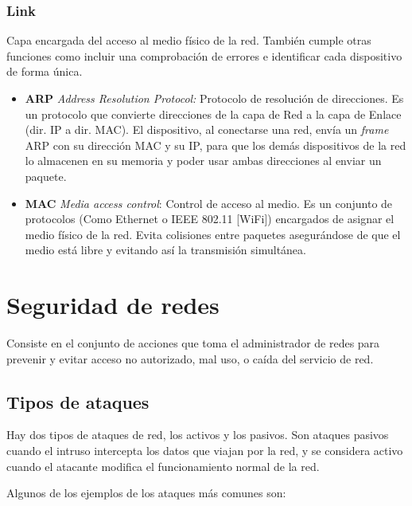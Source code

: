 \documentclass[a4paper, 11pt]{report} %
\begin{document}
\subsubsection{Link}
Capa encargada del acceso al medio físico de la red. También cumple otras funciones como incluir una comprobación de errores e identificar cada dispositivo de forma única.
\begin{itemize}
\item \textbf{ARP} \textit{Address Resolution Protocol:} Protocolo de resolución de direcciones. Es un protocolo que convierte direcciones de la capa de Red a la capa de Enlace (dir. IP a dir. MAC). El dispositivo, al conectarse una red, envía un \textit{frame} ARP con su dirección MAC y su IP, para que los demás dispositivos de la red lo almacenen en su memoria y poder usar ambas direcciones al enviar un paquete.
\item \textbf{MAC} \textit{Media access control}: Control de acceso al medio. Es un conjunto de protocolos (Como Ethernet o IEEE 802.11 [WiFi]) encargados de asignar el medio físico de la red. Evita colisiones entre paquetes asegurándose de que el medio está libre y evitando así la transmisión simultánea.
\end{itemize}

\section{Seguridad de redes}
\label{seguridad}
Consiste en el conjunto de acciones que toma el administrador de redes para prevenir y evitar acceso no autorizado, mal uso, o caída del servicio de red.
\subsection{Tipos de ataques}
Hay dos tipos de ataques de red, los activos y los pasivos. Son ataques pasivos cuando el intruso intercepta los datos que viajan por la red, y se considera activo cuando el atacante modifica el funcionamiento normal de la red.

Algunos de los ejemplos de los ataques más comunes son:
\end{document}
